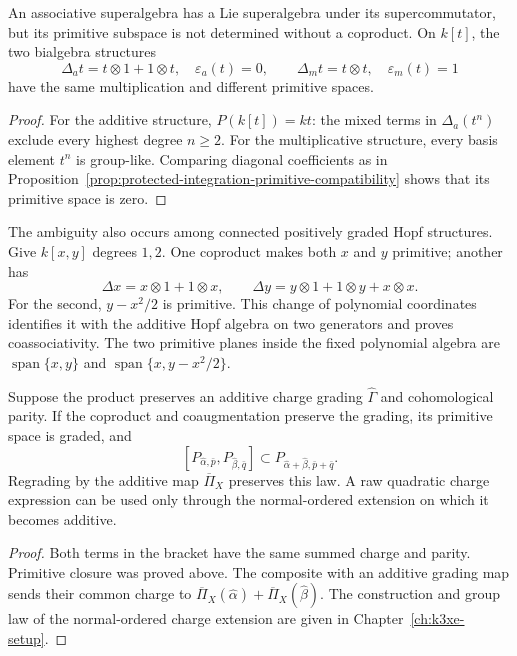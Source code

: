 \begin{proposition}
\label{prop:hall-product-only-no-primitives}
An associative superalgebra has a Lie superalgebra under its
supercommutator, but its primitive subspace is not determined
without a coproduct. On $k[t]$, the two bialgebra structures
\[
 \Delta_a t=t\otimes1+1\otimes t,\quad\varepsilon_a(t)=0,
 \qquad
 \Delta_m t=t\otimes t,\quad\varepsilon_m(t)=1
\]
have the same multiplication and different primitive spaces.
\end{proposition}

\begin{proof}
For the additive structure, $P(k[t])=kt$: the mixed terms in
$\Delta_a(t^n)$ exclude every highest degree $n\geq2$.
For the multiplicative structure, every basis element $t^n$
is group-like. Comparing diagonal coefficients as in
Proposition~\ref{prop:protected-integration-primitive-compatibility}
shows that its primitive space is zero.
\end{proof}

The ambiguity also occurs among connected positively graded
Hopf structures. Give $k[x,y]$ degrees $1,2$. One coproduct
makes both $x$ and $y$ primitive; another has
\[
 \Delta x=x\otimes1+1\otimes x,\qquad
 \Delta y=y\otimes1+1\otimes y+x\otimes x.
\]
For the second, $y-x^2/2$ is primitive. This change of polynomial
coordinates identifies it with the additive Hopf algebra on
two generators and proves coassociativity. The two primitive
planes inside the fixed polynomial algebra are
$\operatorname{span}\{x,y\}$ and
$\operatorname{span}\{x,y-x^2/2\}$.

\begin{proposition}
\label{prop:finite-hall-normal-ordered-gram-degree}
\label{prop:finite-hall-bracket-parity}
Suppose the product preserves an additive charge grading
$\widehat\Gamma$ and cohomological parity. If the coproduct and
coaugmentation preserve the grading, its primitive space is
graded, and
\[
 [P_{\widehat\alpha,\bar p},P_{\widehat\beta,\bar q}]
 \subset P_{\widehat\alpha+\widehat\beta,\bar p+\bar q}.
\]
Regrading by the additive map $\overline\Pi_X$ preserves this
law. A raw quadratic charge expression can be used only through
the normal-ordered extension on which it becomes additive.
\end{proposition}

\begin{proof}
Both terms in the bracket have the same summed charge and
parity. Primitive closure was proved above. The composite with
an additive grading map sends their common charge to
$\overline\Pi_X(\widehat\alpha)+\overline\Pi_X(\widehat\beta)$.
The construction and group law of the normal-ordered charge
extension are given in Chapter~\ref{ch:k3xe-setup}.
\end{proof}

